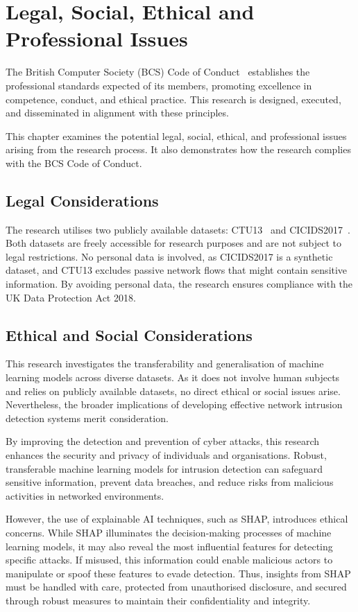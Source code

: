 \chapter{Legal, Social, Ethical and Professional Issues}\label{chap:professional-issues}

The British Computer Society (BCS) Code of Conduct~\cite{bcs2021code} establishes the professional standards expected of its members, promoting excellence in competence, conduct, and ethical practice. This research is designed, executed, and disseminated in alignment with these principles.

This chapter examines the potential legal, social, ethical, and professional issues arising from the research process. It also demonstrates how the research complies with the BCS Code of Conduct.

\section{Legal Considerations}
The research utilises two publicly available datasets: CTU13~\cite{garcia2014empirical} and CICIDS2017~\cite{sharafaldin2018toward}. Both datasets are freely accessible for research purposes and are not subject to legal restrictions. No personal data is involved, as CICIDS2017 is a synthetic dataset, and CTU13 excludes passive network flows that might contain sensitive information. By avoiding personal data, the research ensures compliance with the UK Data Protection Act 2018.

\section{Ethical and Social Considerations}
This research investigates the transferability and generalisation of machine learning models across diverse datasets. As it does not involve human subjects and relies on publicly available datasets, no direct ethical or social issues arise. Nevertheless, the broader implications of developing effective network intrusion detection systems merit consideration.

By improving the detection and prevention of cyber attacks, this research enhances the security and privacy of individuals and organisations. Robust, transferable machine learning models for intrusion detection can safeguard sensitive information, prevent data breaches, and reduce risks from malicious activities in networked environments.

However, the use of explainable AI techniques, such as SHAP, introduces ethical concerns. While SHAP illuminates the decision-making processes of machine learning models, it may also reveal the most influential features for detecting specific attacks. If misused, this information could enable malicious actors to manipulate or spoof these features to evade detection. Thus, insights from SHAP must be handled with care, protected from unauthorised disclosure, and secured through robust measures to maintain their confidentiality and integrity.

